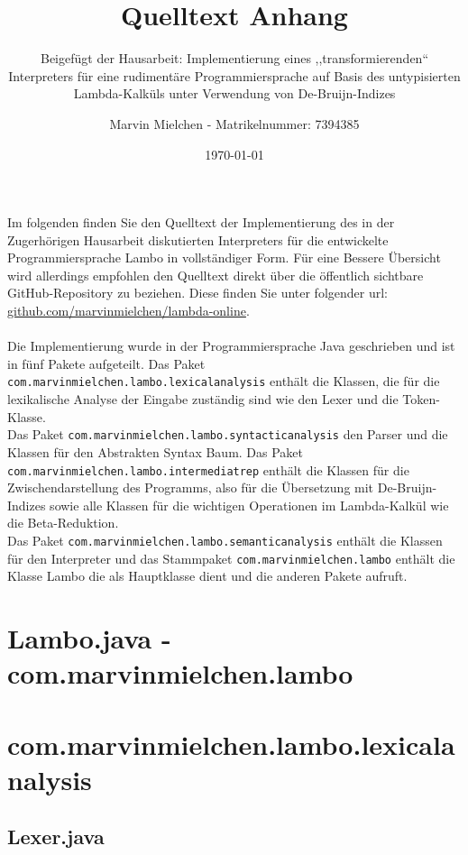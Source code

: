 \documentclass{article}
\title{Quelltext Anhang}
\author{Marvin Mielchen - Matrikelnummer: 7394385}
\subtitle{Beigefügt der Hausarbeit: Implementierung eines ,,transformierenden“ Interpreters für eine rudimentäre Programmiersprache auf Basis des untypisierten Lambda-Kalküls unter Verwendung von De-Bruijn-Indizes}
\date{\today}
\begin{document}
\maketitle
Im folgenden finden Sie den Quelltext der Implementierung des in der Zugerhörigen Hausarbeit diskutierten Interpreters für die entwickelte Programmiersprache Lambo in vollständiger Form. Für eine Bessere Übersicht wird allerdings empfohlen den Quelltext direkt über die öffentlich sichtbare GitHub-Repository zu beziehen. Diese finden Sie unter folgender url: \href{https://github.com/marvinmielchen/lambda-online}{github.com/marvinmielchen/lambda-online}.\\\\
Die Implementierung wurde in der Programmiersprache Java geschrieben und ist in fünf Pakete aufgeteilt. 
Das Paket \texttt{com.marvinmielchen.lambo.lexicalanalysis} enthält die Klassen, die für die lexikalische Analyse der Eingabe zuständig sind wie den Lexer und die Token-Klasse. 
\\Das Paket \texttt{com.marvinmielchen.lambo.syntacticanalysis} den Parser und die Klassen für den Abstrakten Syntax Baum. 
Das Paket \texttt{com.marvinmielchen.lambo.intermediatrep} enthält die Klassen für die Zwischendarstellung des Programms, also für die Übersetzung mit De-Bruijn-Indizes sowie alle Klassen für die wichtigen Operationen im Lambda-Kalkül wie die Beta-Reduktion. 
\\Das Paket \texttt{com.marvinmielchen.lambo.semanticanalysis} enthält die Klassen für den Interpreter und das Stammpaket \texttt{com.marvinmielchen.lambo} enthält die Klasse Lambo die als Hauptklasse dient und die anderen Pakete aufruft.

\newpage
\tableofcontents

\newpage

\section{Lambo.java - com.marvinmielchen.lambo}


\section{com.marvinmielchen.lambo.lexicalanalysis}

\subsection{Lexer.java}

\end{document}
